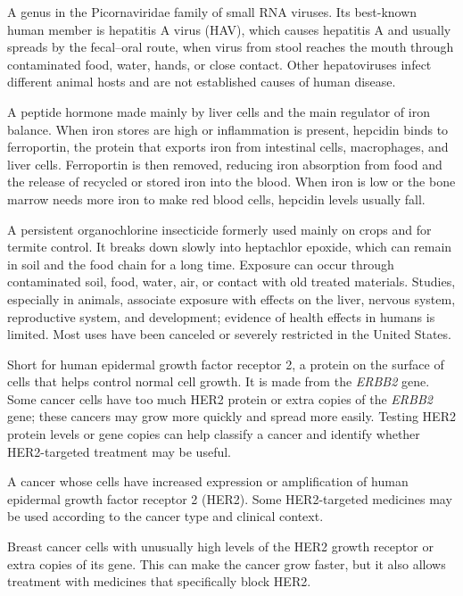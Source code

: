  A genus in the Picornaviridae family of small RNA viruses. Its best-known human member is hepatitis A virus (HAV), which causes hepatitis A and usually spreads by the fecal--oral route, when virus from stool reaches the mouth through contaminated food, water, hands, or close contact. Other hepatoviruses infect different animal hosts and are not established causes of human disease.

 A peptide hormone made mainly by liver cells and the main regulator of iron balance. When iron stores are high or inflammation is present, hepcidin binds to ferroportin, the protein that exports iron from intestinal cells, macrophages, and liver cells. Ferroportin is then removed, reducing iron absorption from food and the release of recycled or stored iron into the blood. When iron is low or the bone marrow needs more iron to make red blood cells, hepcidin levels usually fall.

 A persistent organochlorine insecticide formerly used mainly on crops and for termite control. It breaks down slowly into heptachlor epoxide, which can remain in soil and the food chain for a long time. Exposure can occur through contaminated soil, food, water, air, or contact with old treated materials. Studies, especially in animals, associate exposure with effects on the liver, nervous system, reproductive system, and development; evidence of health effects in humans is limited. Most uses have been canceled or severely restricted in the United States.

 Short for human epidermal growth factor receptor 2, a protein on the surface of cells that helps control normal cell growth. It is made from the \textit{ERBB2} gene. Some cancer cells have too much HER2 protein or extra copies of the \textit{ERBB2} gene; these cancers may grow more quickly and spread more easily. Testing HER2 protein levels or gene copies can help classify a cancer and identify whether HER2-targeted treatment may be useful.

 A cancer whose cells have increased expression or amplification of human epidermal growth factor receptor 2 (HER2). Some HER2-targeted medicines may be used according to the cancer type and clinical context.

 Breast cancer cells with unusually high levels of the HER2 growth receptor or extra copies of its gene. This can make the cancer grow faster, but it also allows treatment with medicines that specifically block HER2.

